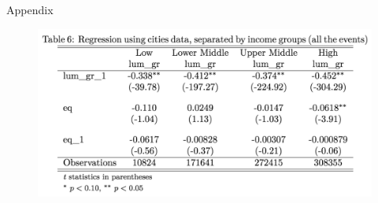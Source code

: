 \documentclass{beamer}
\begin{document}
\begin{section}{Appendix}
\begin{figure}
    \end{figure}
    \begin{figure}
      \centering
      \includegraphics[width=\linewidth]{table6}\label{fig:table6}
    \end{figure}

\end{section}
\end{document}
